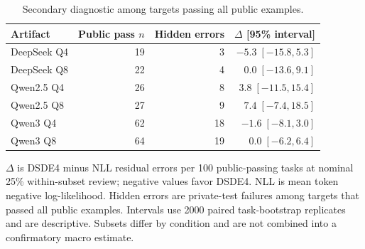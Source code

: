 \begin{table}[htbp]
\centering
\caption{Secondary diagnostic among targets passing all public examples.}
\label{tab:public-pass}
\small
\begin{tabular}{lrrr}
\toprule
Artifact & Public pass $n$ & Hidden errors & $\Delta$ [95\% interval] \\
\midrule
DeepSeek Q4 & 19 & 3 & $-5.3\;[-15.8, 5.3]$ \\
DeepSeek Q8 & 22 & 4 & $0.0\;[-13.6, 9.1]$ \\
Qwen2.5 Q4 & 26 & 8 & $3.8\;[-11.5, 15.4]$ \\
Qwen2.5 Q8 & 27 & 9 & $7.4\;[-7.4, 18.5]$ \\
Qwen3 Q4 & 62 & 18 & $-1.6\;[-8.1, 3.0]$ \\
Qwen3 Q8 & 64 & 19 & $0.0\;[-6.2, 6.4]$ \\
\bottomrule
\end{tabular}
\par\vspace{4pt}\begin{minipage}{0.98\linewidth}\footnotesize $\Delta$ is DSDE4 minus NLL residual errors per 100 public-passing tasks at nominal 25\% within-subset review; negative values favor DSDE4. NLL is mean token negative log-likelihood. Hidden errors are private-test failures among targets that passed all public examples. Intervals use 2000 paired task-bootstrap replicates and are descriptive. Subsets differ by condition and are not combined into a confirmatory macro estimate.\end{minipage}
\end{table}
